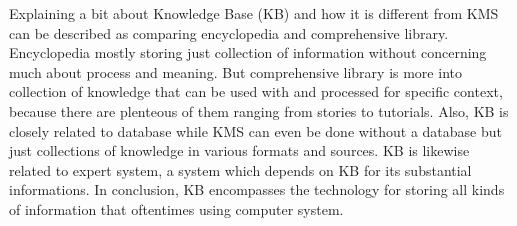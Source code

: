 Explaining a bit about Knowledge Base  (\ac{KB}) and how it is different from \ac{KMS} can be described as comparing encyclopedia and comprehensive library.
Encyclopedia mostly storing just collection of information without concerning much about process and meaning.
But comprehensive library is more into collection of knowledge that can be used with and processed for specific context, because there are plenteous of them ranging from stories to tutorials.
Also, \ac{KB} is closely related to database while \ac{KMS} can even be done without a database but just collections of knowledge in various formats and sources.
\ac{KB} is likewise related to expert system, a system which depends on \ac{KB} for its substantial informations.
In conclusion, \ac{KB} encompasses the technology for storing all kinds of information that oftentimes using computer system.

